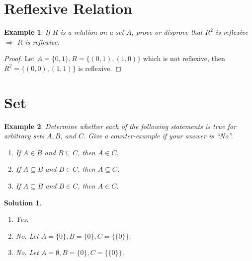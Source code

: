 \documentclass{../../cls/sig-alternate-05-2015}
\newtheorem{example}{Example}
\newtheorem*{solution*}{Solution}
\begin{document}
\section{Reflexive Relation}
\begin{example}
	If $R$ is a relation on a set $A$, prove or disprove that $R^2$ is reflexive $\Rightarrow$ $R$ is reflexive.
\end{example}
\begin{proof}
	Let $A = \{0, 1\}, R = \{(0, 1), (1, 0)\}$ which is not reflexive, then $R^2 = \{(0, 0), (1, 1)\}$ is reflexive.
\end{proof}

\section{Set}
\begin{example}
	Determine  whether each of the following statements is true for arbitrary sets $A, B$, and $C$. Give a counter-example if your answer is ``No''.\begin{enumerate}
		\item If $A \in B$ and $B \subseteq C$, then $A \in C$.
		\item If $A \subseteq B$ and $B \in C$, then $A \subseteq C$.
		\item If $A \subseteq B$ and $B \in C$, then $A \in C$.
	\end{enumerate}
\end{example}
\begin{solution*}
	\begin{enumerate}
		\item Yes.
		\item No. Let $A = \{0\}, B = \{0\}, C = \{\{0\}\}$.
		\item No. Let $A = \emptyset, B = \{0\}, C = \{\{0\}\}$.
	\end{enumerate}
\end{solution*}
\end{document}
